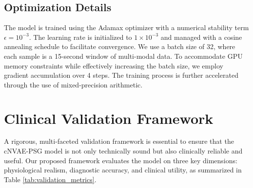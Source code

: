 \documentclass[11pt,en]{elegantpaper}
\begin{document}
\subsection{Optimization Details}

The model is trained using the Adamax optimizer with a numerical stability term $\epsilon = 10^{-3}$. The learning rate is initialized to $1 \times 10^{-3}$ and managed with a cosine annealing schedule to facilitate convergence. We use a batch size of 32, where each sample is a 15-second window of multi-modal data. To accommodate GPU memory constraints while effectively increasing the batch size, we employ gradient accumulation over 4 steps. The training process is further accelerated through the use of mixed-precision arithmetic.

\section{Clinical Validation Framework}

A rigorous, multi-faceted validation framework is essential to ensure that the cNVAE-PSG model is not only technically sound but also clinically reliable and useful. Our proposed framework evaluates the model on three key dimensions: physiological realism, diagnostic accuracy, and clinical utility, as summarized in Table \ref{tab:validation_metrics}.
\end{document}
